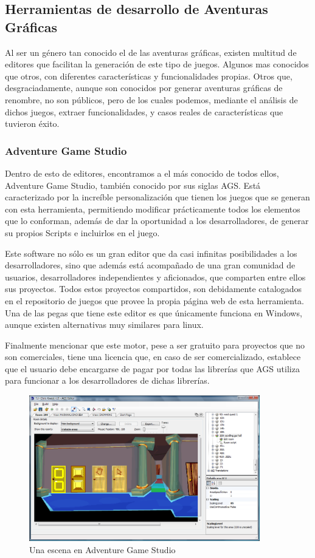 \subsection{Herramientas de desarrollo de Aventuras Gráficas}
\label{herramientasaventuras}

Al ser un género tan conocido el de las aventuras gráficas, existen multitud de editores que facilitan la generación de este tipo de juegos. Algunos mas conocidos que otros, con diferentes características y funcionalidades propias. Otros que, desgraciadamente, aunque son conocidos por generar aventuras gráficas de renombre, no son públicos, pero de los cuales podemos, mediante el análisis de dichos juegos, extraer funcionalidades, y casos reales de características que tuvieron éxito.

\subsubsection{Adventure Game Studio}
\label{adventuregamestudio}

Dentro de esto de editores, encontramos a el más conocido de todos ellos, Adventure Game Studio, también conocido por sus siglas AGS. Está caracterizado por la increíble personalización que tienen los juegos que se generan con esta herramienta, permitiendo modificar prácticamente todos los elementos que lo conforman, además de dar la oportunidad a los desarrolladores, de generar su propios Scripts e incluirlos en el juego. 

Este software no sólo es un gran editor que da casi infinitas posibilidades a los desarrolladores, sino que además está acompañado de una gran comunidad de usuarios, desarrolladores independientes y aficionados, que comparten entre ellos sus proyectos. Todos estos proyectos compartidos, son debidamente catalogados en el repositorio de juegos que provee la propia página web de esta herramienta. Una de las pegas que tiene este editor es que únicamente funciona en Windows, aunque existen alternativas muy similares para linux.

Finalmente mencionar que este motor, pese a ser gratuito para proyectos que no son comerciales, tiene una licencia que, en caso de ser comercializado, establece que el usuario debe encargarse de pagar por todas las librerías que AGS utiliza para funcionar a los desarrolladores de dichas librerías.

\begin{figure}[htb]
    \includegraphics[height=2.5in]{figures/ags.png}
    \caption[Adventure Game Studio]{Una escena en Adventure Game Studio}
    \label{agsfigure}
\end{figure}

